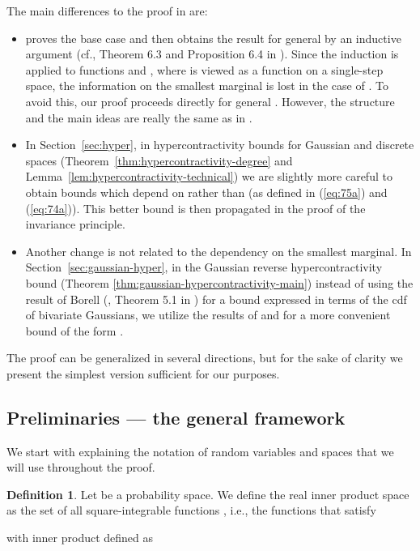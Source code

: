 \documentclass{daj}
\newcommand{\1}{\mathbbm{1}}
\theoremstyle{plain}
\theoremstyle{definition}
\newtheorem{definition}[theorem]{Definition}
\begin{document}
The main differences to the proof in \cite{Mos10} are:
\begin{itemize}
\item \cite{Mos10} proves the base case  and then obtains the result
for general  by an inductive argument 
(cf., Theorem 6.3 and Proposition 6.4 in \cite{Mos10}). Since the induction
is applied to functions  and ,
where  is viewed as a function on a single-step space, the information 
on the smallest marginal is lost in the case of . To avoid this, our proof
proceeds directly for general . However, the structure 
and the main ideas are really the same as in \cite{Mos10}.
\item In Section~\ref{sec:hyper}, in hypercontractivity bounds for Gaussian
  and discrete spaces
(Theorem~\ref{thm:hypercontractivity-degree} and 
Lemma~\ref{lem:hypercontractivity-technical}) we are slightly more careful
to obtain bounds which depend on  rather than 
(as defined in (\ref{eq:75a}) and (\ref{eq:74a})). This better
bound is then propagated in the proof of the invariance principle.
\item Another change is not related to the dependency on the smallest 
  marginal. In Section~\ref{sec:gaussian-hyper},
  in the Gaussian reverse hypercontractivity bound
(Theorem \ref{thm:gaussian-hypercontractivity-main}) instead of
using the result of Borell (\cite{Bor85}, Theorem 5.1 in \cite{Mos10}) 
for a bound expressed in terms of the cdf
of bivariate Gaussians, we utilize the results of \cite{CDP13} and \cite{Led14}
 for a more convenient bound
of the form .
\end{itemize}

The proof can be generalized in several directions, but for the sake
of clarity we present the simplest version sufficient for our purposes.

\subsection{Preliminaries --- the general framework}

We start with explaining the notation of random variables and  spaces 
that we will use throughout the proof.

\begin{definition}
\label{def:l2}
Let  be a probability space.
We define the real inner product space 
as the set of all square-integrable functions 
, i.e., the functions that satisfy

with inner product defined as

\end{definition}
\end{document}
